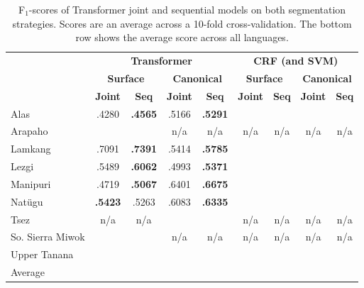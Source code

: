 \begin{table}[tbh]
    \centering
    \begin{tabular}{l|cc|cc|cc|cc}
          & \multicolumn{4}{c|}{\textbf{Transformer}} & \multicolumn{4}{c}{\textbf{CRF (and SVM)}} 
          \\
          & \multicolumn{2}{c|}{\textbf{Surface}} & \multicolumn{2}{c|}{\textbf{Canonical}}  & \multicolumn{2}{c|}{\textbf{Surface}} & \multicolumn{2}{c}{\textbf{Canonical}} 
          \\
          &  \textbf{Joint} & \textbf{Seq} &  \textbf{Joint} & \textbf{Seq} &  \textbf{Joint} & \textbf{Seq} &  \textbf{Joint} & \textbf{Seq} \\
         \hline
         Alas & .4280 & \textbf{.4565} & .5166 & \textbf{.5291} &  &  & \\
         \hline
         Arapaho &  &  & n/a & n/a & n/a & n/a & n/a & n/a  \\
         \hline
         Lamkang & .7091 & \textbf{.7391} & .5414 & \textbf{.5785} &  &  &  &  \\
         \hline
         Lezgi & .5489 & \textbf{.6062} & .4993 & \textbf{.5371} &  &  &  &  \\
         \hline
         Manipuri & .4719 & \textbf{.5067} & .6401 & \textbf{.6675} &  &  &  &  \\
         \hline
         Natügu & \textbf{.5423} & .5263 & .6083 & \textbf{.6335 } &  &  &  &  \\
         \hline
         Tsez & n/a & n/a &  &  & n/a & n/a & n/a & n/a \\
         \hline
         So. Sierra Miwok &  &  & n/a & n/a & n/a & n/a & n/a & n/a \\
         \hline
         Upper Tanana &  &  &  &  &  &  &  &  \\
         \hline
         \hline
         Average &  &  &  &  &  &  &  &  \\
    \end{tabular}
    \caption[Results of Transformer on Joint and Sequential models]{F$_1$-scores of Transformer joint and sequential models on both segmentation strategies. Scores are an average across a 10-fold cross-validation. The bottom row shows the average score across all languages.}
    \label{tab:allresults}
\end{table}


